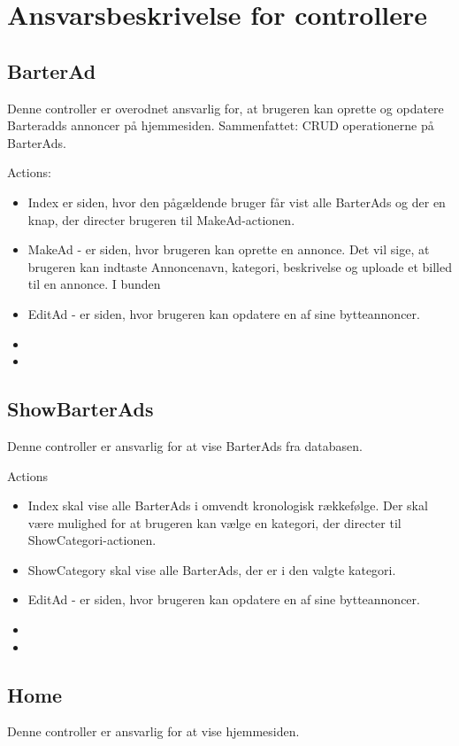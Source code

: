 \chapter{Ansvarsbeskrivelse for controllere}\label{ch:Controllere}

\section{BarterAd}
Denne controller er overodnet ansvarlig for, at brugeren kan oprette og opdatere Barteradds annoncer på hjemmesiden. Sammenfattet: CRUD operationerne på BarterAds.

Actions:
\begin{itemize}
	\item Index er siden, hvor den pågældende bruger får vist alle BarterAds og der en knap, der directer brugeren til MakeAd-actionen.
	\item MakeAd - er siden, hvor brugeren kan oprette en annonce. Det vil sige, at brugeren kan indtaste Annoncenavn, kategori, beskrivelse og uploade et billed til en annonce. I bunden
	\item EditAd - er siden, hvor brugeren kan opdatere en af sine bytteannoncer.
	\item 
	\item
\end{itemize}

\section{ShowBarterAds}
Denne controller er ansvarlig for at vise BarterAds fra databasen.

Actions 
\begin{itemize}
	\item Index skal vise alle BarterAds i omvendt kronologisk rækkefølge. Der skal være mulighed for at brugeren kan vælge en kategori, der directer til ShowCategori-actionen.
	\item ShowCategory skal vise alle BarterAds, der er i den valgte kategori.
	\item EditAd - er siden, hvor brugeren kan opdatere en af sine bytteannoncer.
	\item 
	\item
\end{itemize}


\section{Home}
Denne controller er ansvarlig for at vise hjemmesiden.